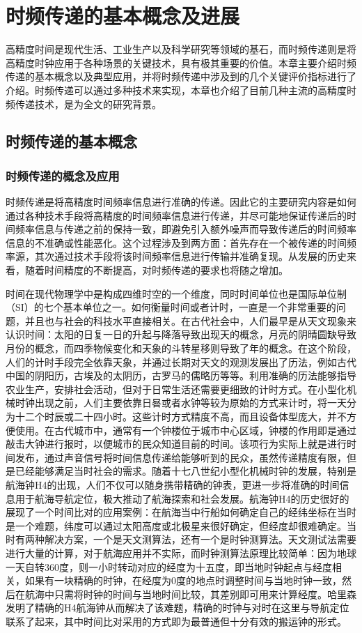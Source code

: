 \chapter{时频传递的基本概念及进展}

高精度时间是现代生活、工业生产以及科学研究等领域的基石，而时频传递则是将高精度时钟应用于各种场景的关键技术，具有极其重要的价值。本章主要介绍时频传递的基本概念以及典型应用，并将时频传递中涉及到的几个关键评价指标进行了介绍。时频传递可以通过多种技术来实现，本章也介绍了目前几种主流的高精度时频传递技术，是为全文的研究背景。

\section{时频传递的基本概念}
\subsection{时频传递的概念及应用}
时频传递是将高精度时间频率信息进行准确的传递。因此它的主要研究内容是如何通过各种技术手段将高精度的时间频率信息进行传递，并尽可能地保证传递后的时间频率信息与传递之前的保持一致，即避免引入额外噪声而导致传递后的时间频率信息的不准确或性能恶化。这个过程涉及到两方面：首先存在一个被传递的时间频率源，其次通过技术手段将该时间频率信息进行传输并准确复现。从发展的历史来看，随着时间精度的不断提高，对时频传递的要求也将随之增加。

时间在现代物理学中是构成四维时空的一个维度，同时时间单位也是国际单位制（SI）的七个基本单位之一。如何衡量时间或者计时，一直是一个非常重要的问题，并且也与社会的科技水平直接相关。在古代社会中，人们最早是从天文现象来认识时间：太阳的日复一日的升起与降落导致出现天的概念，月亮的阴晴圆缺导致月份的概念，而四季物候变化和天象的斗转星移则导致了年的概念。在这个阶段，人们的计时手段完全依靠天象，并通过长期对天文的观测发展出了历法，例如古代中国的阴阳历，古埃及的太阴历，古罗马的儒略历等等。利用准确的历法能够指导农业生产，安排社会活动，但对于日常生活还需要更细致的计时方式。在小型化机械时钟出现之前，人们主要依靠日晷或者水钟等较为原始的方式来计时，将一天分为十二个时辰或二十四小时。这些计时方式精度不高，而且设备体型庞大，并不方便使用。在古代城市中，通常有一个钟楼位于城市中心区域，钟楼的作用即是通过敲击大钟进行报时，以便城市的民众知道目前的时间。该项行为实际上就是进行时间发布，通过声音信号将时间信息传递给能够听到的民众，虽然传递精度有限，但是已经能够满足当时社会的需求。随着十七八世纪小型化机械时钟的发展，特别是航海钟H4的出现，人们不仅可以随身携带精确的钟表，更进一步将准确的时间信息用于航海导航定位，极大推动了航海探索和社会发展。航海钟H4的历史很好的展现了一个时间比对的应用案例：在航海当中行船如何确定自己的经纬坐标在当时是一个难题，纬度可以通过太阳高度或北极星来很好确定，但经度却很难确定。当时有两种解决方案，一个是天文测算法，还有一个是时钟测算法。天文测试法需要进行大量的计算，对于航海应用并不实际，而时钟测算法原理比较简单：因为地球一天自转360度，则一小时转动对应的经度为十五度，即当地时钟起点与经度相关，如果有一块精确的时钟，在经度为0度的地点时调整时间与当地时钟一致，然后在航海中只需将时钟的时间与当地时间比较，其差别即可用来计算经度。哈里森发明了精确的H4航海钟从而解决了该难题，精确的时钟与对时在这里与导航定位联系了起来，其中时间比对采用的方式即为最普通但十分有效的搬运钟的形式。


